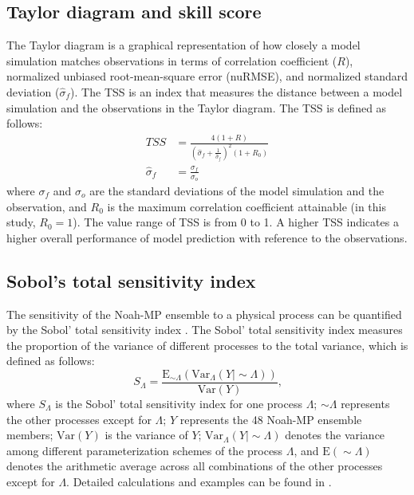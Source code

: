 \documentclass[essd, manuscript]{copernicus}
\begin{document}
\subsection{Taylor diagram and skill score}\label{sec:methods:taylor}

The Taylor diagram \citep{taylor2001JGRA} is a graphical representation of how closely a model simulation matches observations in terms of correlation coefficient (\(R\)), normalized unbiased root-mean-square error (nuRMSE), and normalized standard deviation (\(\hat{\sigma}_{f}\)). The TSS is an index that measures the distance between a model simulation and the observations in the Taylor diagram. The TSS is defined as follows:
\begin{align}
  TSS              & = \frac{4 (1 + R)}{(\hat{\sigma}_{f} + \frac{1}{\hat{\sigma}_{f}})^2 ( 1 + R_{0})} \\
  \hat{\sigma}_{f} & = \frac{\sigma_{f}}{\sigma_{o}}
\end{align}
where \(\sigma_{f}\) and \(\sigma_{o}\) are the standard deviations of the model simulation and the observation, and \(R_{0}\) is the maximum correlation coefficient attainable (in this study, \(R_{0} = 1\)). The value range of TSS is from 0 to 1. A higher TSS indicates a higher overall performance of model prediction with reference to the observations.

\subsection{Sobol's total sensitivity index}\label{sec:methods:sobol}

The sensitivity of the Noah-MP ensemble to a physical process can be quantified by the Sobol' total sensitivity index \citep{sobol1993MMCE, zheng2019WRR}. The Sobol' total sensitivity index measures the proportion of the variance of different processes to the total variance, which is defined as follows:
\begin{equation}
  S_{\Lambda} = \frac{\mathrm{E}_{\sim\Lambda}(\mathrm{Var}_{\Lambda}(Y|\sim\Lambda))}{\mathrm{Var}(Y)}
  \text{,}
\end{equation}
where \(S_{\Lambda}\) is the Sobol' total sensitivity index for one process \(\Lambda\); \(\sim\Lambda\) represents the other processes except for \(\Lambda\); \(Y\) represents the 48 Noah-MP ensemble members; \(\mathrm{Var}(Y)\) is the variance of \(Y\); \(\mathrm{Var}_{\Lambda}(Y|\sim\Lambda)\) denotes the variance among different parameterization schemes of the process \(\Lambda\), and \(\mathrm{E}(\sim\Lambda)\) denotes the arithmetic average across all combinations of the other processes except for \(\Lambda\). Detailed calculations and examples can be found in \citet[Appendix A]{zheng2019WRR}.
\end{document}
